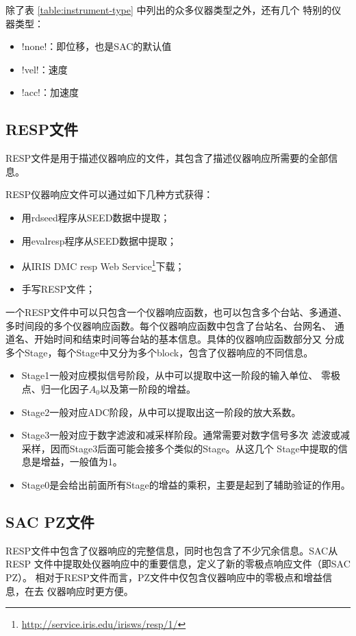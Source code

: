 除了表 \ref{table:instrument-type} 中列出的众多仪器类型之外，还有几个
特别的仪器类型：
\begin{itemize}
\item !none!：即位移，也是SAC的默认值
\item !vel!：速度
\item !acc!：加速度
\end{itemize}

\subsection{RESP文件}
RESP文件是用于描述仪器响应的文件，其包含了描述仪器响应所需要的全部信息。

RESP仪器响应文件可以通过如下几种方式获得：
\begin{itemize}
\item 用rdseed程序从SEED数据中提取；
\item 用evalresp程序从SEED数据中提取；
\item 从IRIS DMC resp Web Service\footnote{\url{http://service.iris.edu/irisws/resp/1/}}下载；
\item 手写RESP文件；
\end{itemize}

一个RESP文件中可以只包含一个仪器响应函数，也可以包含多个台站、多通道、
多时间段的多个仪器响应函数。每个仪器响应函数中包含了台站名、台网名、
通道名、开始时间和结束时间等台站的基本信息。具体的仪器响应函数部分又
分成多个Stage，每个Stage中又分为多个block，包含了仪器响应的不同信息。

\begin{itemize}
\item Stage1一般对应模拟信号阶段，从中可以提取中这一阶段的输入单位、
    零极点、归一化因子$A_0$以及第一阶段的增益。
\item Stage2一般对应ADC阶段，从中可以提取出这一阶段的放大系数。
\item Stage3一般对应于数字滤波和减采样阶段。通常需要对数字信号多次
    滤波或减采样，因而Stage3后面可能会接多个类似的Stage。从这几个
    Stage中提取的信息是增益，一般值为1。
\item Stage0是会给出前面所有Stage的增益的乘积，主要是起到了辅助验证的作用。
\end{itemize}

\subsection{SAC PZ文件}
RESP文件中包含了仪器响应的完整信息，同时也包含了不少冗余信息。SAC从RESP
文件中提取处仪器响应中的重要信息，定义了新的零极点响应文件（即SAC PZ）。
相对于RESP文件而言，PZ文件中仅包含仪器响应中的零极点和增益信息，在去
仪器响应时更方便。

